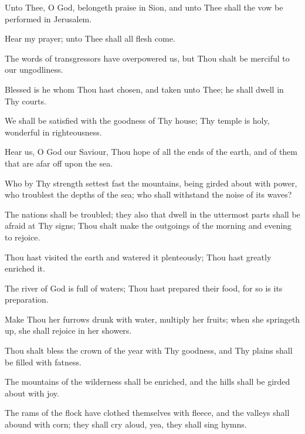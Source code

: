 Unto Thee, O God, belongeth praise in Sion, and unto Thee shall the vow be performed in Jerusalem.

Hear my prayer; unto Thee shall all flesh come.

The words of transgressors have overpowered us, but Thou shalt be merciful to our ungodliness.

Blessed is he whom Thou hast chosen, and taken unto Thee; he shall dwell in Thy courts.

We shall be satisfied with the goodness of Thy house; Thy temple is holy, wonderful in righteousness.

Hear us, O God our Saviour, Thou hope of all the ends of the earth, and of them that are afar off upon the sea.

Who by Thy strength settest fast the mountains, being girded about with power, who troublest the depths of the sea; who shall withstand the noise of its waves?

The nations shall be troubled; they also that dwell in the uttermost parts shall be afraid at Thy signs; Thou shalt make the outgoings of the morning and evening to rejoice.

Thou hast visited the earth and watered it plenteously; Thou hast greatly enriched it.

The river of God is full of waters; Thou hast prepared their food, for so is its preparation.

Make Thou her furrows drunk with water, multiply her fruits; when she springeth up, she shall rejoice in her showers.

Thou shalt bless the crown of the year with Thy goodness, and Thy plains shall be filled with fatness.

The mountains of the wilderness shall be enriched, and the hills shall be girded about with joy.

The rams of the flock have clothed themselves with fleece, and the valleys shall abound with corn; they shall cry aloud, yea, they shall sing hymns.
